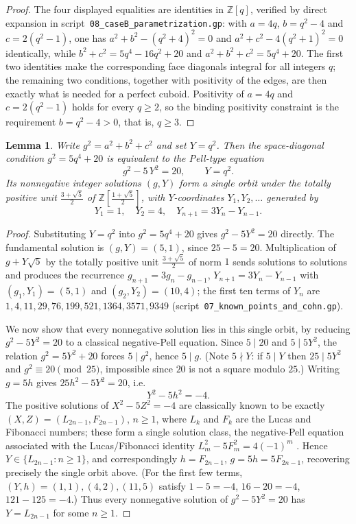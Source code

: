 \documentclass[11pt,reqno]{amsart}
\theoremstyle{plain}
\newtheorem{lemma}[theorem]{Lemma}
\theoremstyle{definition}
\newcommand{\Z}{\mathbb{Z}}
\begin{document}
\begin{proof}
The four displayed equalities are identities in $\Z[q]$, verified by direct
expansion in script~\texttt{08\_caseB\_parametrization.gp}: with $a=4q$,
$b=q^2-4$ and $c=2(q^2-1)$, one has $a^2+b^2-(q^2+4)^2=0$ and
$a^2+c^2-4(q^2+1)^2=0$ identically, while $b^2+c^2=5q^4-16q^2+20$ and
$a^2+b^2+c^2=5q^4+20$. The first two identities make the corresponding face
diagonals integral for all integers $q$; the remaining two conditions, together
with positivity of the edges, are then exactly what is needed for a perfect
cuboid. Positivity of $a=4q$ and $c=2(q^2-1)$ holds for every $q\ge2$, so the
binding positivity constraint is the requirement $b=q^2-4>0$, that is, $q\ge3$.
\end{proof}

\begin{lemma}\label{lem:pell}
Write $g^2=a^2+b^2+c^2$ and set $Y=q^2$. Then the space-diagonal condition
$g^2=5q^4+20$ is equivalent to the Pell-type equation
\[
g^2-5\,Y^2=20,\qquad Y=q^2 .
\]
Its nonnegative integer solutions $(g,Y)$ form a single orbit under the totally
positive unit $\tfrac{3+\sqrt5}{2}$ of $\Z\!\left[\tfrac{1+\sqrt5}{2}\right]$,
with $Y$-coordinates $Y_1,Y_2,\dots$ generated by
\[
Y_1=1,\quad Y_2=4,\quad Y_{n+1}=3Y_n-Y_{n-1}.
\]
\end{lemma}

\begin{proof}
Substituting $Y=q^2$ into $g^2=5q^4+20$ gives $g^2-5Y^2=20$ directly. The
fundamental solution is $(g,Y)=(5,1)$, since $25-5=20$. Multiplication of
$g+Y\sqrt5$ by the totally positive unit $\tfrac{3+\sqrt5}{2}$ of norm $1$ sends
solutions to solutions and produces the recurrence $g_{n+1}=3g_n-g_{n-1}$,
$Y_{n+1}=3Y_n-Y_{n-1}$ with $(g_1,Y_1)=(5,1)$ and $(g_2,Y_2)=(10,4)$; the first
ten terms of $Y_n$ are
$1,4,11,29,76,199,521,1364,3571,9349$
(script~\texttt{07\_known\_points\_and\_cohn.gp}).

We now show that every nonnegative solution lies in this single orbit, by
reducing $g^2-5Y^2=20$ to a classical negative-Pell equation. Since $5\mid 20$
and $5\mid 5Y^2$, the relation $g^2=5Y^2+20$ forces $5\mid g^2$, hence $5\mid g$.
(Note $5\nmid Y$: if $5\mid Y$ then $25\mid 5Y^2$ and $g^2\equiv 20\pmod{25}$,
impossible since $20$ is not a square modulo $25$.) Writing $g=5h$ gives
$25h^2-5Y^2=20$, i.e.
\[
Y^2-5h^2=-4 .
\]
The positive solutions of $X^2-5Z^2=-4$ are classically known to be exactly
$(X,Z)=(L_{2n-1},F_{2n-1})$, $n\ge1$, where $L_k$ and $F_k$ are the Lucas and
Fibonacci numbers; these form a single solution class, the negative-Pell
equation associated with the Lucas/Fibonacci identity $L_m^2-5F_m^2=4(-1)^m$
\cite[Ch.~7]{niven}. Hence $Y\in\{L_{2n-1}:n\ge1\}$, and correspondingly
$h=F_{2n-1}$, $g=5h=5F_{2n-1}$, recovering precisely the single orbit above.
(For the first few terms, $(Y,h)=(1,1),(4,2),(11,5)$ satisfy
$1-5=-4$, $16-20=-4$, $121-125=-4$.) Thus every nonnegative solution of
$g^2-5Y^2=20$ has $Y=L_{2n-1}$ for some $n\ge1$.
\end{proof}
\end{document}
